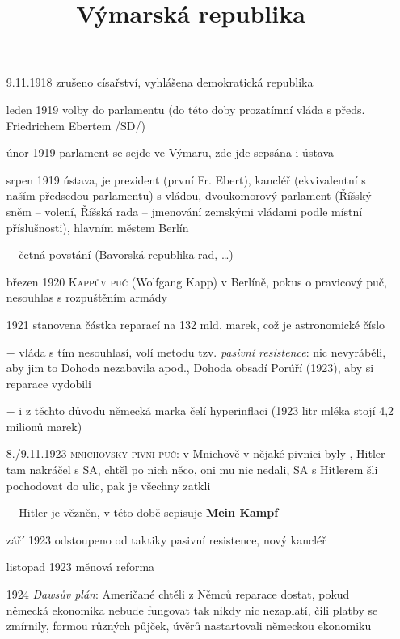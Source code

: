\documentclass{article}
\title{\vspace{-2cm}\Kapitan Výmarská republika\vspace{-1.7cm}}
\date{}
\author{}
\begin{document}
\maketitle

\begin{itemize}
  \vspace{-0.5em}
  \setlength\itemsep{0.15em}
  \item[9.11.1918] zrušeno císařství, vyhlášena demokratická republika
  \item[leden 1919] volby do parlamentu (do této doby prozatímní vláda s předs. Friedrichem Ebertem /SD/)
  \item[únor 1919] parlament se sejde ve Výmaru, zde jde sepsána i ústava
  \item[srpen 1919] ústava, je prezident (první Fr. Ebert), kancléř (ekvivalentní s naším předsedou parlamentu) s vládou, dvoukomorový parlament (Říšský sněm -- volení, Říšská rada -- jmenování zemskými vládami podle místní příslušnosti), hlavním městem Berlín
  \item[$-$] četná povstání (Bavorská republika rad, \dots)
  \item[březen 1920] \textsc{Kappův puč}  (Wolfgang Kapp) v Berlíně, pokus o pravicový puč, nesouhlas s rozpuštěním armády
  \item[1921] stanovena částka reparací na 132 mld. marek, což je astronomické číslo
  \item[$-$] vláda s tím nesouhlasí, volí metodu tzv. \textit{pasivní resistence}:  nic nevyráběli, aby jim to Dohoda nezabavila apod., Dohoda obsadí Porúří (1923), aby si reparace vydobili
  \item[$-$] i z těchto důvodu německá marka čelí hyperinflaci (1923 litr mléka stojí 4,2 milionů marek)
  \item[8./9.11.1923] \textsc{mnichovský pivní puč}: v Mnichově v nějaké pivnici byly , Hitler tam nakráčel s SA, chtěl po nich něco, oni mu nic nedali, SA s Hitlerem šli pochodovat do ulic, pak je všechny zatkli
  \item[$-$] Hitler je vězněn, v této době sepisuje \textbf{Mein Kampf}
  \item[září 1923] odstoupeno od taktiky pasivní resistence, nový kancléř
  \item[listopad 1923] měnová reforma
  \item[1924] \textit{Dawsův plán}: Američané chtěli z Němců reparace dostat, pokud německá ekonomika nebude fungovat tak nikdy nic nezaplatí, čili platby se zmírnily, formou různých půjček, úvěrů nastartovali německou ekonomiku

\end{itemize}
\end{document}
